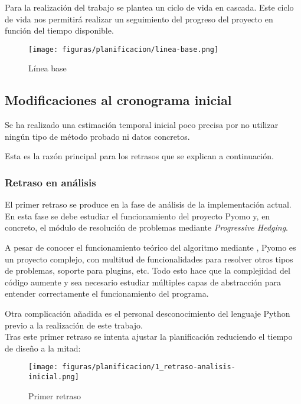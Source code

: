 Para la realización del trabajo se plantea un ciclo de vida en cascada. Este ciclo de vida nos permitirá realizar un seguimiento del progreso del proyecto en función del tiempo disponible.

\begin{figure}[H]
    \centerline{\texttt{[image: figuras/planificacion/linea-base.png]}}
    \caption{Línea base}
\end{figure}

\subsection{Modificaciones al cronograma inicial}
\label{sec:modificacionesCronograma}

Se ha realizado una estimación temporal inicial poco precisa por no utilizar ningún tipo de método probado ni datos concretos.

Esta es la razón principal para los retrasos que se explican a continuación.

\subsubsection{Retraso en análisis}

El primer retraso se produce en la fase de análisis de la implementación actual. En esta fase se debe estudiar el funcionamiento del proyecto Pyomo y, en concreto, el módulo de resolución de problemas mediante \textit{Progressive Hedging}. 

A pesar de conocer el funcionamiento teórico del algoritmo mediante \cite{progressiveHedging}, Pyomo es un proyecto complejo, con multitud de funcionalidades para resolver otros tipos de problemas, soporte para plugins, etc. Todo esto hace que la complejidad del código aumente y sea necesario estudiar múltiples capas de abstracción para entender correctamente el funcionamiento del programa.

Otra complicación añadida es el personal desconocimiento del lenguaje Python previo a la realización de este trabajo.\\

Tras este primer retraso se intenta ajustar la planificación reduciendo el tiempo de diseño a la mitad:

\begin{figure}[H]
    \centerline{\texttt{[image: figuras/planificacion/1\_retraso-analisis-inicial.png]}}
    \caption{Primer retraso}
\end{figure}

